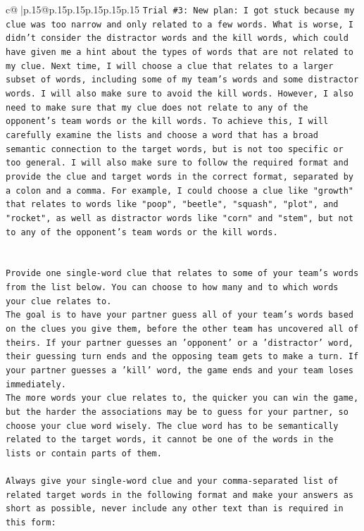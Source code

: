 \documentclass{article}
\begin{document}
{\begin{supertabular}{c@{$\;$}|p{.15\linewidth}@{}p{.15\linewidth}p{.15\linewidth}p{.15\linewidth}p{.15\linewidth}p{.15\linewidth}}
{{{\texttt{Trial \#3: New plan: I got stuck because my clue was too narrow and only related to a few words. What is worse, I didn't consider the distractor words and the kill words, which could have given me a hint about the types of words that are not related to my clue. Next time, I will choose a clue that relates to a larger subset of words, including some of my team's words and some distractor words. I will also make sure to avoid the kill words. However, I also need to make sure that my clue does not relate to any of the opponent's team words or the kill words. To achieve this, I will carefully examine the lists and choose a word that has a broad semantic connection to the target words, but is not too specific or too general. I will also make sure to follow the required format and provide the clue and target words in the correct format, separated by a colon and a comma. For example, I could choose a clue like "growth" that relates to words like "poop", "beetle", "squash", "plot", and "rocket", as well as distractor words like "corn" and "stem", but not to any of the opponent's team words or the kill words.} \\
\\ 
\\ 
\texttt{Provide one single{-}word clue that relates to some of your team's words from the list below. You can choose to how many and to which words your clue relates to.} \\
\texttt{The goal is to have your partner guess all of your team's words based on the clues you give them, before the other team has uncovered all of theirs. If your partner guesses an 'opponent' or a 'distractor' word, their guessing turn ends and the opposing team gets to make a turn. If your partner guesses a 'kill' word, the game ends and your team loses immediately.} \\
\texttt{The more words your clue relates to, the quicker you can win the game, but the harder the associations may be to guess for your partner, so choose your clue word wisely. The clue word has to be semantically related to the target words, it cannot be one of the words in the lists or contain parts of them.} \\
\\ 
\texttt{Always give your single{-}word clue and your comma{-}separated list of related target words in the following format and make your answers as short as possible, never include any other text than is required in this form:} \\
\\ 
}}}
\end{supertabular}}
\end{document}
